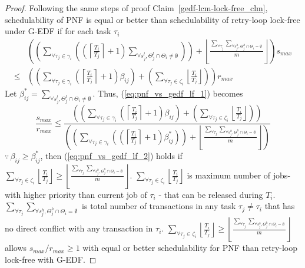 \begin{proof}\normalfont
%
Following the same steps of proof Claim~\ref{gedf-lcm-lock-free_clm}, schedulability of PNF is equal or better than schedulability of retry-loop lock-free under G-EDF if for each task $\tau_i$
%
\begin{eqnarray}
 & \left(\left(\sum_{\forall\tau_{j}\in\gamma_{i}}\left(\left(\left\lceil \frac{T_{i}}{T_{j}}\right\rceil +1\right)\sum_{\forall s_{j}^{l},\Theta_{j}^{l}\cap\Theta_{i}\neq\emptyset}\right)\right)+\left\lfloor \frac{\sum_{\forall\tau_{j}}\sum_{\forall s_{j}^{h},\Theta_{j}^{h}\cap\Theta_{i}=\emptyset}}{m}\right\rfloor \right)s_{max}\nonumber \\
\le & \left(\left(\sum_{\forall\tau_{j}\in\gamma_{i}}\left(\left\lceil \frac{T_{i}}{T_{j}}\right\rceil +1\right)\beta_{ij}\right)+\left(\sum_{\forall\tau_{j}\in\zeta_{i}}\left\lfloor \frac{T_{i}}{T_{j}}\right\rfloor \right)\right)r_{max}\label{eq:pnf_vs_gedf_lf_1}
\end{eqnarray}
%
Let $\beta_{ij}^{*}=\sum_{\forall s_{j}^{l},\Theta_{j}^{l}\cap\Theta_{i}\neq\emptyset}$.
Thus, (\ref{eq:pnf_vs_gedf_lf_1}) becomes 
%
\begin{equation}
\frac{s_{max}}{r_{max}}\le\frac{\left(\left(\sum_{\forall\tau_{j}\in\gamma_{i}}\left(\left\lceil \frac{T_{i}}{T_{j}}\right\rceil +1\right)\beta_{ij}\right)+\left(\sum_{\forall\tau_{j}\in\zeta_{i}}\left\lfloor \frac{T_{i}}{T_{j}}\right\rfloor \right)\right)}{\left(\left(\sum_{\forall\tau_{j}\in\gamma_{i}}\left(\left(\left\lceil \frac{T_{i}}{T_{j}}\right\rceil +1\right)\beta_{ij}^{*}\right)\right)+\left\lfloor \frac{\sum_{\forall\tau_{j}}\sum_{\forall s_{j}^{h},\Theta_{j}^{h}\cap\Theta_{i}=\emptyset}}{m}\right\rfloor \right)}\label{eq:pnf_vs_gedf_lf_2}
\end{equation}
%
$\because\,\beta_{ij}\ge\beta_{ij}^{*}$, then (\ref{eq:pnf_vs_gedf_lf_2})
holds if $\sum_{\forall\tau_{j}\in\zeta_{i}}\left\lfloor \frac{T_{i}}{T_{j}}\right\rfloor \ge\left\lfloor \frac{\sum_{\forall\tau_{j}}\sum_{\forall s_{j}^{h},\Theta_{j}^{h}\cap\Theta_{i}=\emptyset}}{m}\right\rfloor $.
$\sum_{\forall\tau_{j}\in\zeta_{i}}\left\lfloor \frac{T_{i}}{T_{j}}\right\rfloor $
is maximum number of jobs- with higher priority than current job of
$\tau_{i}$ - that can be released during $T_{i}$. $\sum_{\forall\tau_{j}}\sum_{\forall s_{j}^{h},\Theta_{j}^{h}\cap\Theta_{i}=\emptyset}$
is total number of transactions in any task $\tau_{j}\neq\tau_{i}$
that has no direct conflict with any transaction in $\tau_{i}$. $\sum_{\forall\tau_{j}\in\zeta_{i}}\left\lfloor \frac{T_{i}}{T_{j}}\right\rfloor \ge\left\lfloor \frac{\sum_{\forall\tau_{j}}\sum_{\forall s_{j}^{h},\Theta_{j}^{h}\cap\Theta_{i}=\emptyset}}{m}\right\rfloor $
allows $s_{max}/r_{max}\ge1$ with equal or better schedulability for PNF than retry-loop lock-free with G-EDF.
%
\end{proof}
